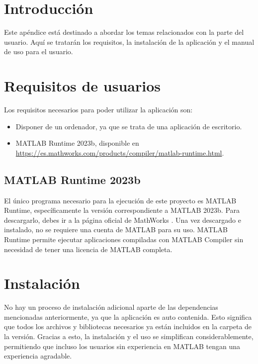 
\section{Introducción}\label{introducción-manual-usuario}

Este apéndice está destinado a abordar los temas relacionados con la parte del usuario. Aquí se tratarán los requisitos, la instalación de la aplicación y el manual de uso para el usuario.

\section{Requisitos de usuarios}\label{requisitos-de-usuario}

Los requisitos necesarios para poder utilizar la aplicación son:

\begin{itemize}
    \item Disponer de un ordenador, ya que se trata de una aplicación de escritorio.
    \item MATLAB Runtime 2023b, disponible en \url{https://es.mathworks.com/products/compiler/matlab-runtime.html}.
\end{itemize}

\subsection{MATLAB Runtime 2023b}\label{matlab-2023b-usuario}

El único programa necesario para la ejecución de este proyecto es MATLAB Runtime, específicamente la versión correspondiente a MATLAB 2023b. Para descargarlo, debes ir a la página oficial de MathWorks \cite{matlabRuntime}. Una vez descargado e instalado, no se requiere una cuenta de MATLAB para su uso. MATLAB Runtime permite ejecutar aplicaciones compiladas con MATLAB Compiler sin necesidad de tener una licencia de MATLAB completa.

\section{Instalación}\label{instalación-usuario}

No hay un proceso de instalación adicional aparte de las dependencias mencionadas anteriormente, ya que la aplicación es auto contenida. Esto significa que todos los archivos y bibliotecas necesarios ya están incluidos en la carpeta de la versión. Gracias a esto, la instalación y el uso se simplifican considerablemente, permitiendo que incluso los usuarios sin experiencia en MATLAB tengan una experiencia agradable.

